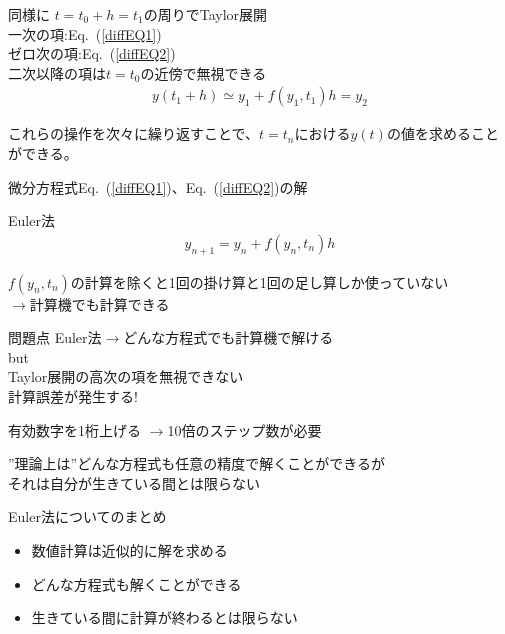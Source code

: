\documentclass[unicode, 12pt, aspectratio=169]{beamer}
\newcommand{\eref}[1]{Eq.~(\ref{#1})}
\begin{document}
\begin{frame}
  \begin{block}{同様に}
    $t=t_0 + h = t_1$の周りでTaylor展開\\
    一次の項:\eref{diffEQ1}\\
    ゼロ次の項:\eref{diffEQ2}\\
    二次以降の項は$t=t_0$の近傍で無視できる\\
    \begin{align}
      y(t_1 + h) \simeq y_1 + f(y_1,t_1)h = y_2\label{EulerMethod2} 
    \end{align}
  \end{block}
    これらの操作を次々に繰り返すことで、$t=t_n$における$y(t)$の値を求めることができる。
\end{frame}

\begin{frame}
    微分方程式\eref{diffEQ1}、\eref{diffEQ2}の解
    \begin{block}{Euler法}
      \begin{align}
        y_{n+1} = y_n + f(y_n,t_n)h\label{EulerMethod}
      \end{align}
    \end{block}
    $f(y_n,t_n)$の計算を除くと1回の掛け算と1回の足し算しか使っていない\\
    $\rightarrow$計算機でも計算できる
\end{frame}

 \begin{frame}{問題点}
    Euler法$\rightarrow$どんな方程式でも計算機で解ける\\
    \alert{but}\\
    Taylor展開の高次の項を無視できない\\
    計算誤差が発生する!\\
    \begin{exampleblock}{有効数字を1桁上げる}
    $\rightarrow$10倍のステップ数が必要
    \end{exampleblock}
    ”理論上は”どんな方程式も任意の精度で解くことができるが\\それは\alert{自分が生きている間とは限らない}
\end{frame}

\begin{frame}{Euler法についてのまとめ}
      \begin{itemize}
          \item 数値計算は近似的に解を求める
          \item どんな方程式も解くことができる
          \item 生きている間に計算が終わるとは限らない
      \end{itemize}
\end{frame}
\end{document}
